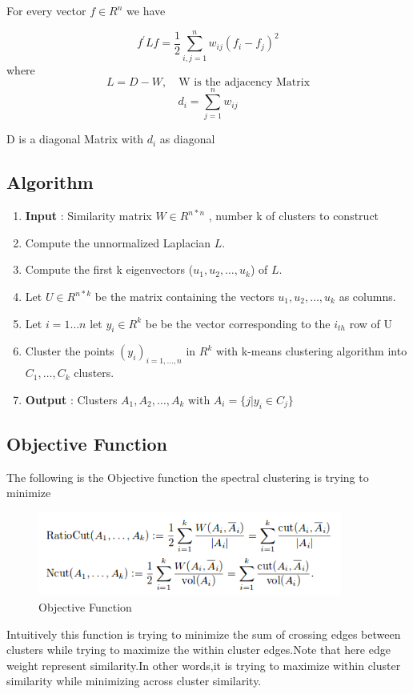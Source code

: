 For every vector $f \in R^{n}$ we have

\[f^{'}Lf = \frac{1}{2}\sum_{i,j=1}^{n}w_{ij}\left (f_{i} - f_{j} \right )^{2}\]
where 
\[ L = D - W  , \quad \text{W is the adjacency Matrix} \]
\[d_{i} = \sum_{j=1}^{n}w_{ij} \]
\centerline{D is a diagonal Matrix with $d_{i}$  as diagonal}

\subsection{Algorithm}
\begin{enumerate}
    \item \textbf{Input} : Similarity matrix $W \in R^{n*n}$ , number k of clusters to construct
    \item Compute the unnormalized Laplacian $L$.
    \item Compute the first k eigenvectors ($u_{1},u_{2},\dots,u_{k}$) of $L$.
    \item Let $U \in R^{n*k}$ be the matrix containing the vectors $u_{1},u_{2},\dots,u_{k}$ as columns.
    \item Let $i = 1\dots n$ let $y_{i} \in R^{k}$ be be the vector corresponding to the $i_{th}$ row of U
    \item Cluster the points $(y_{i})_{i=1,\dots,n}$ in $R^{k}$ with k-means clustering algorithm into $C_{1},\dots,C_{k}$ clusters.
    \item \textbf{Output} : Clusters $A_{1},A_{2},\dots,A_{k}$ with $A_{i} = \{j | y_{i} \in C_{j} \}$
    
    
\end{enumerate}


\subsection{Objective Function}
The following is the Objective function the spectral clustering is trying to minimize
\begin{figure} [!htbp]
\centering
\includegraphics[width=100mm]{Pictures/obj.png}
\caption{Objective Function}
\end{figure}

Intuitively this function is trying to minimize the  sum of crossing edges between clusters while trying to maximize the within cluster edges.Note that here edge weight represent similarity.In other words,it is trying to maximize within cluster similarity while minimizing across cluster similarity.

